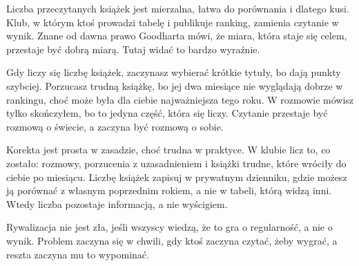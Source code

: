 Liczba przeczytanych książek jest mierzalna, łatwa do porównania i dlatego kusi. Klub, w którym ktoś prowadzi tabelę i publikuje ranking, zamienia czytanie w wynik. Znane od dawna prawo Goodharta mówi, że miara, która staje się celem, przestaje być dobrą miarą. Tutaj widać to bardzo wyraźnie.

\begin{falle}
Gdy liczy się liczbę książek, zaczynasz wybierać krótkie tytuły, bo dają punkty szybciej. Porzucasz trudną książkę, bo jej dwa miesiące nie wyglądają dobrze w rankingu, choć może była dla ciebie najważniejsza tego roku. W rozmowie mówisz tylko \glqq skończyłem\grqq{}, bo to jedyna część, która się liczy. Czytanie przestaje być rozmową o świecie, a zaczyna być rozmową o sobie.

Korekta jest prosta w zasadzie, choć trudna w praktyce. W klubie licz to, co zostało: rozmowy, porzucenia z uzasadnieniem i książki trudne, które wróciły do ciebie po miesiącu. Liczbę książek zapisuj w prywatnym dzienniku, gdzie możesz ją porównać z własnym poprzednim rokiem, a nie w tabeli, którą widzą inni. Wtedy liczba pozostaje informacją, a nie wyścigiem.
\end{falle}

Rywalizacja nie jest zła, jeśli wszyscy wiedzą, że to gra o regularność, a nie o wynik. Problem zaczyna się w chwili, gdy ktoś zaczyna czytać, żeby wygrać, a reszta zaczyna mu to wypominać.


